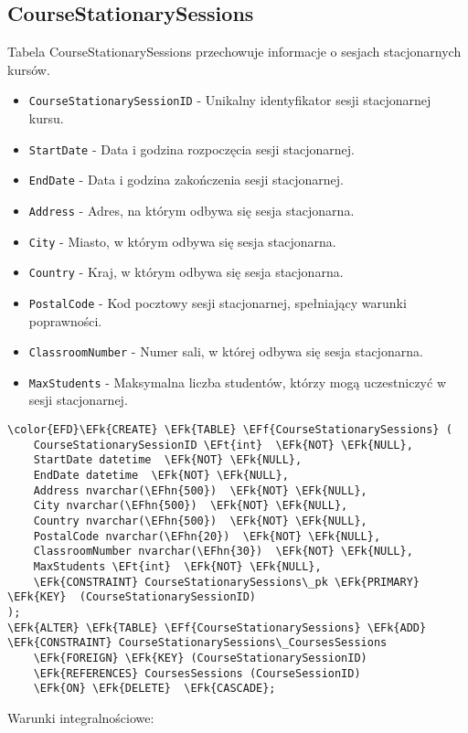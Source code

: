\documentclass[11pt]{article}
\newcommand{\EFk}[1]{\textcolor{EFk}{\textbf{#1}}} %
\newcommand{\EFf}[1]{\textcolor{EFf}{#1}} %
\newcommand{\EFt}[1]{\textcolor{EFt}{\textbf{#1}}} %
\newcommand{\EFhn}[1]{\textcolor{EFhn}{#1}} %
\begin{document}
\subsection{CourseStationarySessions}
\label{sec:orgf158ed7}
Tabela CourseStationarySessions przechowuje informacje o sesjach stacjonarnych kursów.
\begin{itemize}
\item \texttt{CourseStationarySessionID} - Unikalny identyfikator sesji stacjonarnej kursu.
\item \texttt{StartDate} - Data i godzina rozpoczęcia sesji stacjonarnej.
\item \texttt{EndDate} - Data i godzina zakończenia sesji stacjonarnej.
\item \texttt{Address} - Adres, na którym odbywa się sesja stacjonarna.
\item \texttt{City} - Miasto, w którym odbywa się sesja stacjonarna.
\item \texttt{Country} - Kraj, w którym odbywa się sesja stacjonarna.
\item \texttt{PostalCode} - Kod pocztowy sesji stacjonarnej, spełniający warunki poprawności.
\item \texttt{ClassroomNumber} - Numer sali, w której odbywa się sesja stacjonarna.
\item \texttt{MaxStudents} - Maksymalna liczba studentów, którzy mogą uczestniczyć w sesji stacjonarnej.
\end{itemize}
\begin{Code}
\begin{Verbatim}
\color{EFD}\EFk{CREATE} \EFk{TABLE} \EFf{CourseStationarySessions} (
    CourseStationarySessionID \EFt{int}  \EFk{NOT} \EFk{NULL},
    StartDate datetime  \EFk{NOT} \EFk{NULL},
    EndDate datetime  \EFk{NOT} \EFk{NULL},
    Address nvarchar(\EFhn{500})  \EFk{NOT} \EFk{NULL},
    City nvarchar(\EFhn{500})  \EFk{NOT} \EFk{NULL},
    Country nvarchar(\EFhn{500})  \EFk{NOT} \EFk{NULL},
    PostalCode nvarchar(\EFhn{20})  \EFk{NOT} \EFk{NULL},
    ClassroomNumber nvarchar(\EFhn{30})  \EFk{NOT} \EFk{NULL},
    MaxStudents \EFt{int}  \EFk{NOT} \EFk{NULL},
    \EFk{CONSTRAINT} CourseStationarySessions\_pk \EFk{PRIMARY} \EFk{KEY}  (CourseStationarySessionID)
);
\EFk{ALTER} \EFk{TABLE} \EFf{CourseStationarySessions} \EFk{ADD} \EFk{CONSTRAINT} CourseStationarySessions\_CoursesSessions
    \EFk{FOREIGN} \EFk{KEY} (CourseStationarySessionID)
    \EFk{REFERENCES} CoursesSessions (CourseSessionID)
    \EFk{ON} \EFk{DELETE}  \EFk{CASCADE};
\end{Verbatim}
\end{Code}
Warunki integralnościowe:
\end{document}
